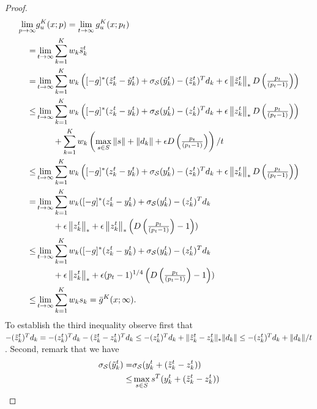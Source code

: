 \documentclass[12pt]{article}
\theoremstyle{thmstyleone}%
\theoremstyle{thmstyletwo}%
\theoremstyle{thmstylethree}%
\newcommand{\reviewChanges}{}
\begin{document}
\begin{appendices}
\begin{proof}
  \begin{align*}
    \lim_{p\to\infty} &g_u^K(x;p) = \lim_{t\to\infty} g_u^K(x;p_t)\\
    =  & \lim_{t\to\infty} \sum_{k=1}^K w_k \tilde s_k^t\\
    \reviewChanges{=} & \lim_{t\to\infty} \sum_{k=1}^Kw_k\left([-g]^*(\tilde z^t_{k} - \tilde y^t_{k}) + \sigma_{\supp}(\tilde y^t_{k}) - (\tilde z^t_{k})^T{d}_k  +\epsilon \left\|\tilde z^t_{k} \right\|_* D\left(\tfrac{p_t}{(p_t-1)}\right)\right)\\
    \leq &\lim_{t\to\infty} \sum_{k=1}^Kw_k\left([-g]^*(z^t_{k} - y^t_{k}) + \sigma_{\supp}(y^t_{k}) - (z^t_{k})^T{d}_k  +\epsilon \left\|z^t_{k} \right\|_* D\left(\tfrac{p_t}{(p_t-1)}\right)\right)\\
                                            & \qquad  + \sum_{k=1}^Kw_k\left(\max_{s\in S} \norm{s}+\norm{d_k}+\epsilon D\left(\tfrac{p_t}{(p_t-1)}\right) \right)/t\\
    \leq &\lim_{t\to\infty} \sum_{k=1}^Kw_k\left([-g]^*(z^t_{k} - y^t_{k}) + \sigma_{\supp}(y^t_{k}) - (z^t_{k})^T{d}_k  +\epsilon \left\|z^t_{k} \right\|_* D\left(\tfrac{p_t}{(p_t-1)}\right)\right)\\
    \reviewChanges{=} &\lim_{t\to\infty} \sum_{k=1}^Kw_k([-g]^*(z^t_{k} - y^t_{k}) + \sigma_{\supp}(y^t_{k}) - (z^t_{k})^T{d}_k  \\
		& \qquad +\epsilon \left\|z^t_{k} \right\|_* + \epsilon \left\|z^t_{k} \right\|_* \left(D\left(\tfrac{p_t}{(p_t-1)}\right)-1\right))\\
    \leq &\lim_{t\to\infty} \sum_{k=1}^Kw_k([-g]^*(z^t_{k} - y^t_{k}) + \sigma_{\supp}(y^t_{k}) - (z^t_{k})^T{d}_k \\
		& \qquad +\epsilon \left\|z^t_{k} \right\|_* + \epsilon  (p_t-1)^{1/4} \left(D\left(\tfrac{p_t}{(p_t-1)}\right)-1\right))\\
    \leq & \lim_{t\to\infty} \sum_{k=1}^Kw_ks_k = \bar g^K(x;\infty).
  \end{align*}  
  To establish the third inequality observe first that $-(\tilde z^t_{k})^T{d}_k = -(z^t_{k})^T{d}_k - (\tilde z^t_k-z^t_k)^Td_k\leq -(z^t_{k})^T{d}_k + \| \tilde z^t_k-z^t_k \|_* \| d_k \|\leq -(z^t_{k})^T{d}_k + \| d_k \|/t$. \reviewChanges{Second, remark that we have 
    \begin{align*}
      \sigma_{\supp}(\tilde y^t_{k}) = & \sigma_{\supp}(y^t_{k}+(\tilde z^t_k-z_k^t)) \\
      \leq & \max_{s\in S} s^T(y^t_{k}+(\tilde z^t_k-z_k^t)) \\

\end{align*}}
\end{proof}
\end{appendices}
\end{document}
